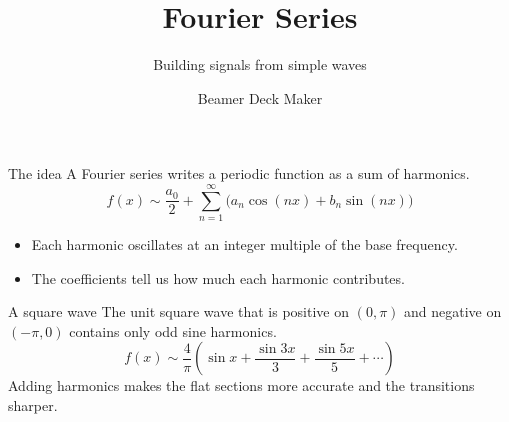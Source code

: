\documentclass[aspectratio=169]{beamer}
\title{Fourier Series}
\subtitle{Building signals from simple waves}
\author{Beamer Deck Maker}
\date{}
\begin{document}
\begin{frame}
  \titlepage
\end{frame}

\begin{frame}{The idea}
  A Fourier series writes a periodic function as a sum of harmonics.
  \[
    f(x) \sim \frac{a_0}{2}
    + \sum_{n=1}^{\infty} \bigl(a_n\cos(nx) + b_n\sin(nx)\bigr)
  \]
  \begin{itemize}
    \item Each harmonic oscillates at an integer multiple of the base frequency.
    \item The coefficients tell us how much each harmonic contributes.
  \end{itemize}
\end{frame}

\begin{frame}{A square wave}
  The unit square wave that is positive on $(0,\pi)$ and negative on
  $(-\pi,0)$ contains only odd sine harmonics.
  \[
    f(x) \sim \frac{4}{\pi}\left(\sin x + \frac{\sin 3x}{3}
    + \frac{\sin 5x}{5} + \cdots\right)
  \]
  Adding harmonics makes the flat sections more accurate and the transitions sharper.
\end{frame}
\end{document}
